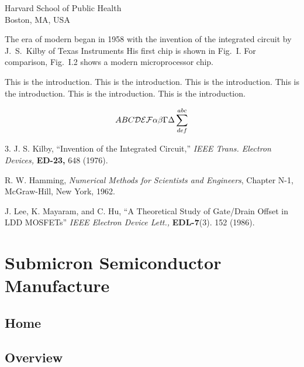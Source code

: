 \documentclass{wileySix}
\begin{document}
\begin{introduction}


{Harvard School of Public Health\\
Boston, MA, USA}

The era of modern  
began in 1958 with the invention of the
integrated circuit by J.~S.~Kilby
 of Texas Instruments
His first chip is shown in Fig.~I. For comparison,
Fig.~I.2 shows a modern microprocessor chip.


This is the introduction.
This is the introduction.
This is the introduction.
This is the introduction.
This is the introduction.
This is the introduction.

\begin{equation}
ABC {\cal DEF} \alpha\beta\Gamma\Delta\sum^{abc}_{def}
\end{equation}


\begin{chapreferences}{3.}
J. S. Kilby,
``Invention of the Integrated Circuit,'' {\it IEEE Trans. Electron Devices,}
{\bf ED-23,} 648 (1976).

R. W. Hamming,
                 {\it Numerical Methods for Scientists and 
                 Engineers}, Chapter N-1, McGraw-Hill, 
                 New York, 1962.

J. Lee, K. Mayaram, and C. Hu, ``A Theoretical
               Study of Gate/Drain Offset in LDD MOSFETs''
                     {\it IEEE Electron Device Lett.,} {\bf EDL-7}(3). 152 
                     (1986).
\end{chapreferences}
\end{introduction}


\part[Submicron Semiconductor Manufacture]
{Submicron Semiconductor\\ Manufacture}

\chapter{Home}


\chapter{Overview}

\end{document}

